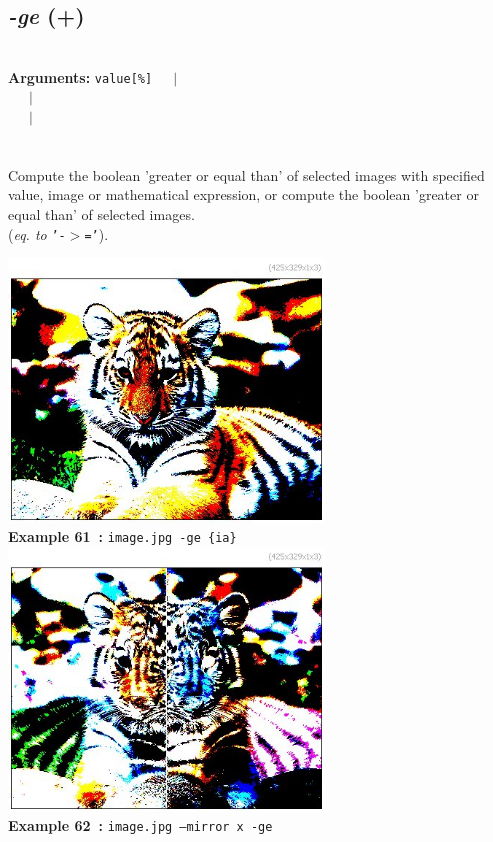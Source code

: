 \documentclass[a4paper,11pt,twoside]{book}
\begin{document}
\subsection{\emph{-ge} (+)}\vspace*{-0.5em}
~\\\textbf{Arguments: } 
{\small \texttt{value[\%]}}~~~$|$\\
\hspace*{2.2cm}{\small \texttt{[image]}}~~~$|$\\
~~~$|$\\
\\~\\
Compute the boolean 'greater or equal than' of selected images with specified value, image
or mathematical expression, or compute the boolean 'greater or equal than' of selected images.
~\\(\emph{eq. to} {\small \texttt{'-$>$='}}).
\begin{center}\includegraphics[keepaspectratio=true,height=7cm,width=\textwidth]{img/gmic_def61.jpg}\\
{\footnotesize \textbf{Example 61~:} \texttt{image.jpg -ge \{ia\}}}
\\\includegraphics[keepaspectratio=true,height=7cm,width=\textwidth]{img/gmic_def62.jpg}\\
{\footnotesize \textbf{Example 62~:} \texttt{image.jpg --mirror x -ge}}
\end{center}
\end{document}
